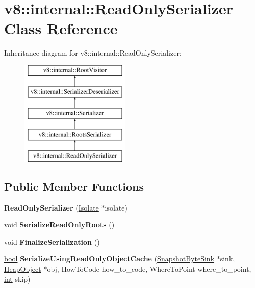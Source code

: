 \hypertarget{classv8_1_1internal_1_1ReadOnlySerializer}{}\section{v8\+:\+:internal\+:\+:Read\+Only\+Serializer Class Reference}
\label{classv8_1_1internal_1_1ReadOnlySerializer}
Inheritance diagram for v8\+:\+:internal\+:\+:Read\+Only\+Serializer\+:\begin{figure}[H]
\begin{center}
\leavevmode
\includegraphics[height=5.000000cm]{classv8_1_1internal_1_1ReadOnlySerializer}
\end{center}
\end{figure}
\subsection*{Public Member Functions}
\begin{DoxyCompactItemize}
\item 
\mbox{\label{classv8_1_1internal_1_1ReadOnlySerializer_a14606a11dd352312514708e94b199e7f}} 
{\bfseries Read\+Only\+Serializer} (\mbox{\hyperlink{classv8_1_1internal_1_1Isolate}{Isolate}} $\ast$isolate)
\item 
\mbox{\label{classv8_1_1internal_1_1ReadOnlySerializer_a8f444fc9b29fdf22e0aac492910f5a1d}} 
void {\bfseries Serialize\+Read\+Only\+Roots} ()
\item 
\mbox{\label{classv8_1_1internal_1_1ReadOnlySerializer_a198998b2f3b8d9e237cdd6b8f4dfb87b}} 
void {\bfseries Finalize\+Serialization} ()
\item 
\mbox{\label{classv8_1_1internal_1_1ReadOnlySerializer_af74800661dbe47233748230c87668aa0}} 
\mbox{\hyperlink{classbool}{bool}} {\bfseries Serialize\+Using\+Read\+Only\+Object\+Cache} (\mbox{\hyperlink{classv8_1_1internal_1_1SnapshotByteSink}{Snapshot\+Byte\+Sink}} $\ast$sink, \mbox{\hyperlink{classv8_1_1internal_1_1HeapObject}{Heap\+Object}} $\ast$obj, How\+To\+Code how\+\_\+to\+\_\+code, Where\+To\+Point where\+\_\+to\+\_\+point, \mbox{\hyperlink{classint}{int}} skip)
\end{DoxyCompactItemize}
